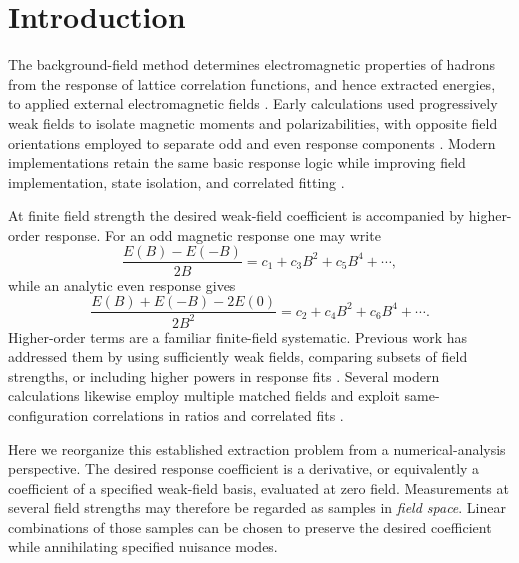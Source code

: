 \documentclass[aps,prd,reprint,twocolumn,superscriptaddress,nofootinbib,longbibliography]{revtex4-2}
\begin{document}
\maketitle

\section{Introduction}

The background-field method determines electromagnetic properties of hadrons from the response of lattice correlation functions, and hence extracted energies, to applied external electromagnetic fields \cite{Martinelli1982,Bernard1982}. Early calculations used progressively weak fields to isolate magnetic moments and polarizabilities, with opposite field orientations employed to separate odd and even response components \cite{Lee2005MagPol,Lee2005BaryonMom,Lee2008MagMom,Alexandru2009BFM}. Modern implementations retain the same basic response logic while improving field implementation, state isolation, and correlated fitting \cite{Detmold2010Electric,Detmold2011Review,Davoudi2015Background,Bignell2020Pion,Kabelitz2024Octet}.

At finite field strength the desired weak-field coefficient is accompanied by higher-order response. For an odd magnetic response one may write
\begin{equation}
\frac{E(B)-E(-B)}{2B}=c_1+c_3B^2+c_5B^4+\cdots,
\label{eq:oddreduced}
\end{equation}
while an analytic even response gives
\begin{equation}
\frac{E(B)+E(-B)-2E(0)}{2B^2}=c_2+c_4B^2+c_6B^4+\cdots.
\label{eq:evenreduced}
\end{equation}
Higher-order terms are a familiar finite-field systematic. Previous work has addressed them by using sufficiently weak fields, comparing subsets of field strengths, or including higher powers in response fits \cite{Lee2005MagPol}. Several modern calculations likewise employ multiple matched fields and exploit same-configuration correlations in ratios and correlated fits \cite{Primer2014,Bignell2017Nucleon,Bignell2020Pion,Kabelitz2024Octet}.

Here we reorganize this established extraction problem from a numerical-analysis perspective. The desired response coefficient is a derivative, or equivalently a coefficient of a specified weak-field basis, evaluated at zero field. Measurements at several field strengths may therefore be regarded as samples in \emph{field space}. Linear combinations of those samples can be chosen to preserve the desired coefficient while annihilating specified nuisance modes.
\end{document}
